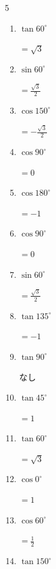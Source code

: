 \begin{multicols}{5}
\begin{enumerate}
  \item $\displaystyle \tan{60^\circ}$

        $\displaystyle =\sqrt{3}$

  \item $\displaystyle \sin{60^\circ}$

        $\displaystyle =\frac{\sqrt{3}}{2}$

  \item $\displaystyle \cos{150^\circ}$

        $\displaystyle =-\frac{\sqrt{3}}{2}$

  \item $\displaystyle \cos{90^\circ}$

        $\displaystyle =0$

\columnbreak %

  \item $\displaystyle \cos{180^\circ}$

        $\displaystyle =-1$

  \item $\displaystyle \cos{90^\circ}$

        $\displaystyle =0$

  \item $\displaystyle \sin{60^\circ}$

        $\displaystyle =\frac{\sqrt{3}}{2}$

  \item $\displaystyle \tan{135^\circ}$

        $\displaystyle =-1$

  \item $\displaystyle \tan{90^\circ}$

        $\displaystyle なし$

  \item $\displaystyle \tan{45^\circ}$

        $\displaystyle =1$

  \item $\displaystyle \tan{60^\circ}$

        $\displaystyle =\sqrt{3}$

  \item $\displaystyle \cos{0^\circ}$

        $\displaystyle =1$

  \item $\displaystyle \cos{60^\circ}$

        $\displaystyle =\frac{1}{2}$

  \item $\displaystyle \tan{150^\circ}$


\end{enumerate}
\end{multicols}
